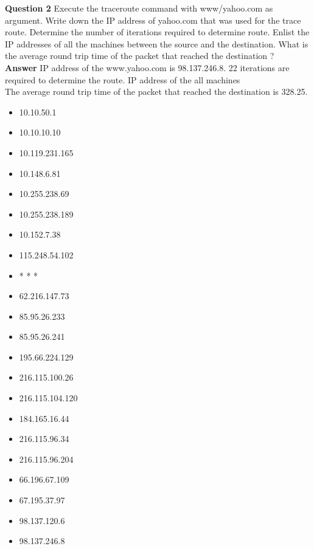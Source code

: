 \documentclass[14pt]{extarticle}
\begin{document}
    
    \textbf{\large Question 2}
    Execute the traceroute command with www/yahoo.com as argument. Write down the IP address of
yahoo.com that was used for the trace route. Determine the number of iterations required to determine
route. Enlist the IP addresses of all the machines between the source and the destination. What is the
average round trip time of the packet that reached the destination ?\\[10pt]
    \textbf{\large Answer}
    IP address of the www.yahoo.com is 98.137.246.8. 22 iterations are required to determine the route. IP address of the all machines \\[8pt]
    The average round trip time of the packet that reached the destination is 328.25.
    \begin{itemize}
        \item 10.10.50.1
        \item 10.10.10.10
        \item 10.119.231.165
        \item 10.148.6.81
        \item 10.255.238.69
        \item 10.255.238.189
        \item 10.152.7.38
        \item 115.248.54.102
        \item * * *
        \item 62.216.147.73
        \item 85.95.26.233
        \item 85.95.26.241
        \item 195.66.224.129
        \item 216.115.100.26
        \item 216.115.104.120
        \item 184.165.16.44
        \item 216.115.96.34
        \item 216.115.96.204
        \item 66.196.67.109
        \item 67.195.37.97
        \item 98.137.120.6
        \item 98.137.246.8
    \end{itemize} 
\end{document}
